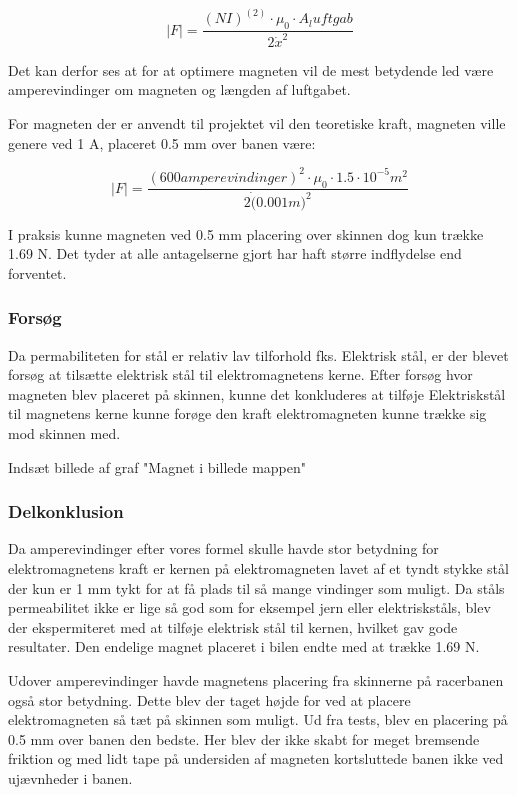 \begin{equation}
\mid F \mid = \frac{(NI)^(2) \cdot \mu_0 \cdot A_luftgab } {2 \dot x^2}
\end{equation}

Det kan derfor ses at for at optimere magneten vil de mest betydende led være amperevindinger om magneten og længden af luftgabet.

For magneten der er anvendt til projektet vil den teoretiske kraft, magneten ville genere ved 1 A, placeret 0.5 mm over banen være: %

\begin{equation}
\mid F \mid = \frac{(600 amperevindinger)^2 \cdot \mu_0 \cdot 1.5 \cdot 10^{-5} m^2 } {2 \dot (0.001m)^2}
\end{equation}

I praksis kunne magneten ved 0.5 mm placering over skinnen dog kun trække  1.69 N. Det tyder at alle antagelserne gjort har haft større indflydelse end forventet.

\subsubsection{Forsøg}
Da permabiliteten for stål er relativ lav tilforhold fks. Elektrisk stål, er der blevet forsøg at tilsætte elektrisk stål til elektromagnetens kerne. Efter forsøg hvor magneten blev placeret på skinnen, kunne det konkluderes at tilføje Elektriskstål til magnetens kerne kunne forøge den kraft elektromagneten kunne trække sig mod skinnen med.

Indsæt billede af graf "Magnet i billede mappen"


\subsubsection{Delkonklusion}
Da amperevindinger efter vores formel skulle havde stor betydning for elektromagnetens kraft er kernen på elektromagneten lavet af et tyndt stykke stål der kun er 1 mm tykt for at få plads til så mange vindinger som muligt. Da ståls permeabilitet ikke er lige så god som for eksempel jern eller elektriskståls, blev der ekspermiteret med at tilføje elektrisk stål til kernen, hvilket gav gode resultater. Den endelige magnet placeret i bilen endte med at trække 1.69 N.

Udover amperevindinger havde magnetens placering fra skinnerne på racerbanen også stor betydning. Dette blev der taget højde for ved at placere elektromagneten så tæt på skinnen som muligt. Ud fra tests, blev en placering på 0.5 mm over banen den bedste. Her blev der ikke skabt for meget bremsende friktion og med lidt tape på undersiden af magneten kortsluttede banen ikke ved ujævnheder i banen.
